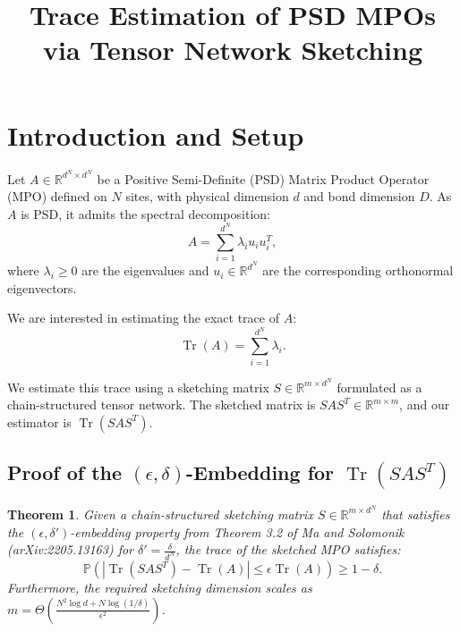 \documentclass{article}
\title{Trace Estimation of PSD MPOs via Tensor Network Sketching}
\author{}
\date{}
\newtheorem{theorem}{Theorem}
\theoremstyle{remark}
\begin{document}
\maketitle

\section{Introduction and Setup}

Let $A \in \mathbb{R}^{d^N \times d^N}$ be a Positive Semi-Definite (PSD) Matrix Product Operator (MPO) defined on $N$ sites, with physical dimension $d$ and bond dimension $D$. As $A$ is PSD, it admits the spectral decomposition:
\begin{equation}
    A = \sum_{i=1}^{d^N} \lambda_i u_i u_i^T,
\end{equation}
where $\lambda_i \ge 0$ are the eigenvalues and $u_i \in \mathbb{R}^{d^N}$ are the corresponding orthonormal eigenvectors. 

We are interested in estimating the exact trace of $A$:
\begin{equation}
    \operatorname{Tr}(A) = \sum_{i=1}^{d^N} \lambda_i.
\end{equation}

We estimate this trace using a sketching matrix $S \in \mathbb{R}^{m \times d^N}$ formulated as a chain-structured tensor network. The sketched matrix is $S A S^T \in \mathbb{R}^{m \times m}$, and our estimator is $\operatorname{Tr}(S A S^T)$.

\subsection{Proof of the $(\epsilon, \delta)$-Embedding for $\operatorname{Tr}(S A S^T)$}

\begin{theorem}\label{thm:k1}
Given a chain-structured sketching matrix $S \in \mathbb{R}^{m \times d^N}$ that satisfies the $(\epsilon, \delta')$-embedding property from Theorem 3.2 of Ma and Solomonik (arXiv:2205.13163) for $\delta' = \frac{\delta}{d^N}$, the trace of the sketched MPO satisfies:
\begin{equation}
    \mathbb{P}\left( \left| \operatorname{Tr}(S A S^T) - \operatorname{Tr}(A) \right| \le \epsilon \operatorname{Tr}(A) \right) \ge 1 - \delta.
\end{equation}
Furthermore, the required sketching dimension scales as $m = \Theta\left( \frac{N^2 \log d + N \log(1/\delta)}{\epsilon^2} \right)$.
\end{theorem}
\end{document}
